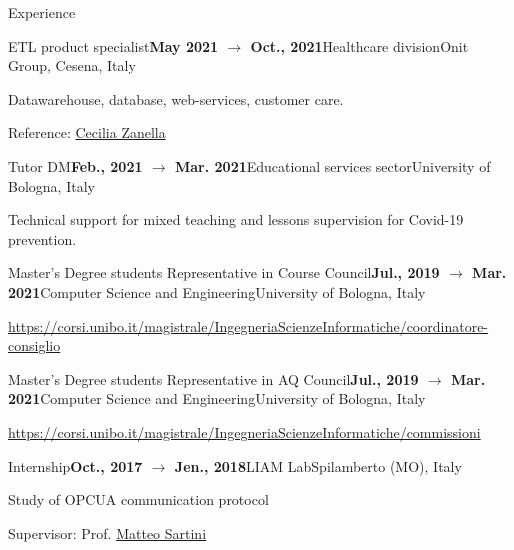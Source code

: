 \documentclass{resume} %
\begin{document}
\begin{rSection}{Experience}
        \begin{rSubsection}{ETL product specialist}{\textbf{May 2021 $\rightarrow$ Oct., 2021}}{Healthcare division}{Onit Group, Cesena, Italy}
            \item Datawarehouse, database, web-services, customer care.
            \item Reference: \href{mailto:czanella@onit.it}{Cecilia Zanella}
        \end{rSubsection}
        
        \begin{rSubsection}{Tutor DM}{\textbf{Feb., 2021 $\rightarrow$ Mar. 2021}}{Educational services sector}{University of Bologna, Italy}
            \item Technical support for mixed teaching and lessons supervision for Covid-19 prevention.
        \end{rSubsection}
        
        \begin{rSubsection}{Master's Degree students Representative in Course Council}{\textbf{Jul., 2019 $\rightarrow$ Mar. 2021}}{Computer Science and Engineering}{University of Bologna, Italy}
            \item \url{https://corsi.unibo.it/magistrale/IngegneriaScienzeInformatiche/coordinatore-consiglio}
        \end{rSubsection}
        
        \begin{rSubsection}{Master's Degree students Representative in AQ Council}{\textbf{Jul., 2019 $\rightarrow$ Mar. 2021}}{Computer Science and Engineering}{University of Bologna, Italy}
            \item \url{https://corsi.unibo.it/magistrale/IngegneriaScienzeInformatiche/commissioni}
        \end{rSubsection}
        
        \begin{rSubsection}{Internship}{\textbf{Oct., 2017 $\rightarrow$ Jen., 2018}}{LIAM Lab}{Spilamberto (MO), Italy}
            \item Study of OPCUA communication protocol
            \item Supervisor: Prof. \href{mailto:matteo.sartini@unibo.it}{Matteo Sartini} 
        \end{rSubsection}
        
    \end{rSection}
    
\end{document}
